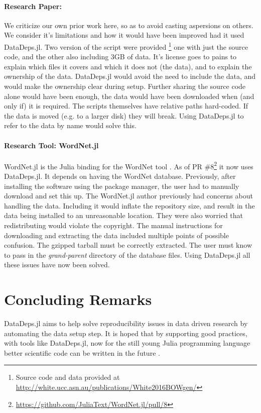 \documentclass[twoside,11pt]{article}
\begin{document}
\paragraph{Research Paper: \citet{White2015BOWgen}}
We criticize our own prior work here, so as to avoid casting aspersions on others. We consider it's limitations and how it would have been improved had it used DataDeps.jl.
%
Two version of the script were provided \footnote{Source code and data provided at \url{http://white.ucc.asn.au/publications/White2016BOWgen/}}
one with just the source code, and the other also including 3GB of data.
It's license goes to pains to explain which files it covers and which it does not (the data), and to explain the ownership of the data.
DataDeps.jl would avoid the need to include the data, and would make the ownership clear during setup.
Further sharing the source code alone would have been enough, the data would have been downloaded when  (and only if) it is required.
%
The scripts themselves have relative paths hard-coded. If the data is moved (e.g. to a larger disk) they will break.
Using DataDeps.jl to refer to the data by name would solve this.


\paragraph{Research Tool: WordNet.jl}\label{sec:research-tool-wordnetjl}
WordNet.jl is the Julia binding for the WordNet tool \citep{miller1995wordnet}.
As of PR \#8\footnote{\url{https://github.com/JuliaText/WordNet.jl/pull/8}} it now uses DataDeps.jl.
It depends on having the WordNet database.
Previously, after installing the software using the package manager,
the user had to manually download and set this up.
%
The WordNet.jl author previously had concerns about handling the data.
Including it would inflate the repository size, and result in the data being installed to an unreasonable location.
They were also worried that redistributing would violate the copyright.
%
The manual instructions for downloading and extracting the data included multiple points of possible confusion.
The gzipped tarball must be correctly extracted.
The user must know to pass in the \emph{grand-parent} directory of the database files.
Using DataDeps.jl all these issues have now been solved.


\section {Concluding Remarks}
DataDeps.jl aims to help solve reproducibility issues in data driven research by automating the data setup step.
It is hoped that by supporting good practices, with tools like DataDeps.jl, now for the still young Julia programming language
better scientific code can be written in the future .
\end{document}
